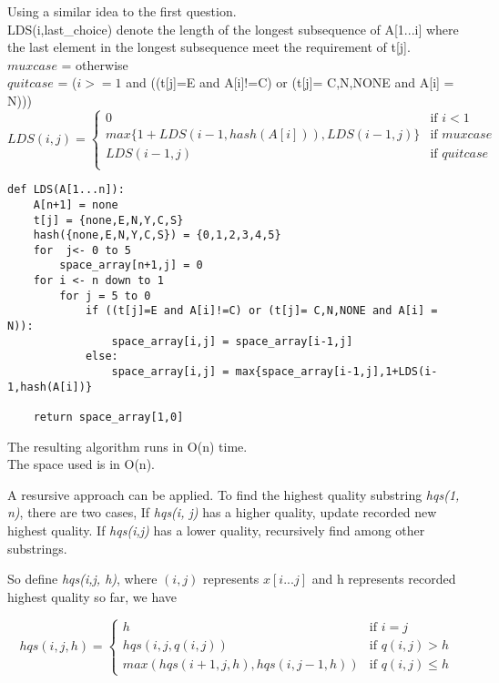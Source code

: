 \documentclass[12pt,a4paper]{article}
\newcommand{\question}[1]{\bigskip\noindent{\textbf{Q{#1} solution}}}
\begin{document}
\question{16.B}

Using a similar idea to the first question.\\
LDS(i,last\_choice) denote the length of the longest subsequence of A[1...i] where the last  element in the longest subsequence meet the requirement of t[j].
\\$muxcase$ =  otherwise
\\$quitcase$ = ($i>=1$ and ((t[j]=E and A[i]!=C) or (t[j]= C,N,NONE and A[i] = N)))
\begin{equation*}
LDS(i,j) = 
  \begin{cases}
    0 & \mbox{if } i < 1 \\
    max\{1+LDS(i-1,hash(A[i])),LDS(i-1,j)\} & \mbox{if }  mux case \\
    LDS(i-1,j) & \mbox{if }    quit case \\
  \end{cases}
\end{equation*}
\begin{lstlisting}
def LDS(A[1...n]):
	A[n+1] = none
	t[j] = {none,E,N,Y,C,S}
	hash({none,E,N,Y,C,S}) = {0,1,2,3,4,5}
	for  j<- 0 to 5
		space_array[n+1,j] = 0
	for i <- n down to 1
		for j = 5 to 0
			if ((t[j]=E and A[i]!=C) or (t[j]= C,N,NONE and A[i] = N)):
				space_array[i,j] = space_array[i-1,j]
			else:
				space_array[i,j] = max{space_array[i-1,j],1+LDS(i-1,hash(A[i])}
	
	return space_array[1,0]	
\end{lstlisting}
The resulting algorithm runs in O(n) time.\\
The space used is in O(n).\\


\question{17.A}

A resursive approach can be applied. To find the highest quality substring {\em hqs(1, n)}, there are two cases, If {\em hqs(i, j)} has a higher quality, update recorded new highest quality. If {\em hqs(i,j)} has a lower quality, recursively find among other substrings.

So define {\em hqs(i,j, h)}, where $(i,j)$ represents $x[i...j]$ and h represents recorded highest quality so far, we have

\begin{equation*}
hqs(i,j,h) = 
  \begin{cases}
    h & \mbox{if } i = j \\
    hqs(i, j, q(i, j)) & \mbox{if } q(i, j) > h \\
    max(hqs(i + 1, j, h), hqs(i, j - 1, h)) & \mbox{if } q(i,j) \le h
  \end{cases}
\end{equation*}
\end{document}

